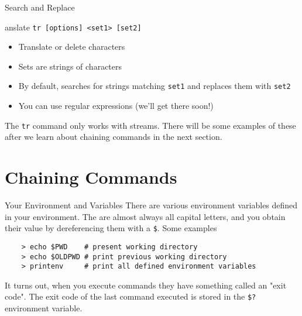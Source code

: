 \begin{frame}[fragile]{Search and Replace}
  \begin{block}{anslate}
    \texttt{tr [options] <set1> [set2]}
    \begin{itemize}
      \item Translate or delete characters
      \item Sets are strings of characters
      \item By default, searches for strings matching \texttt{set1} and replaces them with \texttt{set2}
      \item You can use regular expressions (we'll get there soon!)
    \end{itemize}
  \end{block}

  The \texttt{tr} command only works with streams.  There will be some examples of these after we learn about
  chaining commands in the next section.
\end{frame}

%

%
\section{Chaining Commands}
\label{sec:chaining_commands}

\begin{frame}[fragile]{Your Environment and Variables}
  There are various environment variables defined in your environment.  The are almost always all capital letters,
  and you obtain their value by dereferencing them with a \texttt{\$}.  Some examples

  \begin{verbatim}
    > echo $PWD    # present working directory
    > echo $OLDPWD # print previous working directory
    > printenv     # print all defined environment variables
  \end{verbatim}

  It turns out, when you execute commands they have something called an "exit code".  The exit code of the last
  command executed is stored in the \texttt{\$?} environment variable.
\end{frame}

